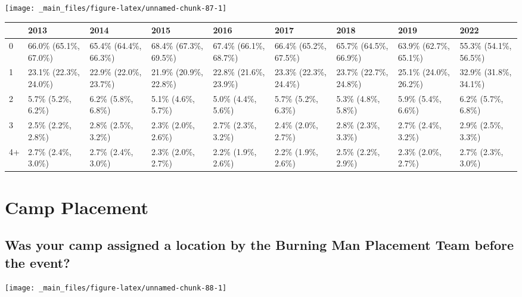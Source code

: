 \documentclass[
]{book}
\begin{document}
\texttt{[image: \_main\_files/figure-latex/unnamed-chunk-87-1]}

\begin{table}
\centering
\begin{tabular}[t]{>{}l|>{}l|>{}l|>{}l|>{}l|>{}l|>{}l|>{}l|>{}l}
\hline
  & 2013 & 2014 & 2015 & 2016 & 2017 & 2018 & 2019 & 2022\\
\hline
0 & 66.0\% (65.1\%, 67.0\%) & 65.4\% (64.4\%, 66.3\%) & 68.4\% (67.3\%, 69.5\%) & 67.4\% (66.1\%, 68.7\%) & 66.4\% (65.2\%, 67.5\%) & 65.7\% (64.5\%, 66.9\%) & 63.9\% (62.7\%, 65.1\%) & 55.3\% (54.1\%, 56.5\%)\\
\hline
1 & 23.1\% (22.3\%, 24.0\%) & 22.9\% (22.0\%, 23.7\%) & 21.9\% (20.9\%, 22.8\%) & 22.8\% (21.6\%, 23.9\%) & 23.3\% (22.3\%, 24.4\%) & 23.7\% (22.7\%, 24.8\%) & 25.1\% (24.0\%, 26.2\%) & 32.9\% (31.8\%, 34.1\%)\\
\hline
2 & 5.7\% (5.2\%, 6.2\%) & 6.2\% (5.8\%, 6.8\%) & 5.1\% (4.6\%, 5.7\%) & 5.0\% (4.4\%, 5.6\%) & 5.7\% (5.2\%, 6.3\%) & 5.3\% (4.8\%, 5.8\%) & 5.9\% (5.4\%, 6.6\%) & 6.2\% (5.7\%, 6.8\%)\\
\hline
3 & 2.5\% (2.2\%, 2.8\%) & 2.8\% (2.5\%, 3.2\%) & 2.3\% (2.0\%, 2.6\%) & 2.7\% (2.3\%, 3.2\%) & 2.4\% (2.0\%, 2.7\%) & 2.8\% (2.3\%, 3.3\%) & 2.7\% (2.4\%, 3.2\%) & 2.9\% (2.5\%, 3.3\%)\\
\hline
4+ & 2.7\% (2.4\%, 3.0\%) & 2.7\% (2.4\%, 3.0\%) & 2.3\% (2.0\%, 2.7\%) & 2.2\% (1.9\%, 2.6\%) & 2.2\% (1.9\%, 2.6\%) & 2.5\% (2.2\%, 2.9\%) & 2.3\% (2.0\%, 2.7\%) & 2.7\% (2.3\%, 3.0\%)\\
\hline
\end{tabular}
\end{table}

\hypertarget{camp-placement}{%
\section{Camp Placement}\label{camp-placement}}

\hypertarget{was-your-camp-assigned-a-location-by-the-burning-man-placement-team-before-the-event}{%
\subsection{Was your camp assigned a location by the Burning Man Placement Team before the event?}\label{was-your-camp-assigned-a-location-by-the-burning-man-placement-team-before-the-event}}

\texttt{[image: \_main\_files/figure-latex/unnamed-chunk-88-1]}
\end{document}
